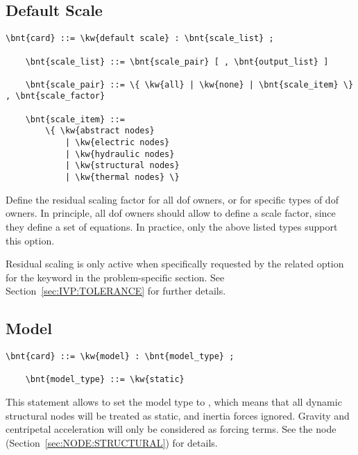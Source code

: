 \subsection{Default Scale}\label{sec:CONTROLDATA:DEFAULTSCALE}
\begin{Verbatim}[commandchars=\\\{\}]
    \bnt{card} ::= \kw{default scale} : \bnt{scale_list} ;

    \bnt{scale_list} ::= \bnt{scale_pair} [ , \bnt{output_list} ]

    \bnt{scale_pair} ::= \{ \kw{all} | \kw{none} | \bnt{scale_item} \} , \bnt{scale_factor}

    \bnt{scale_item} ::=
        \{ \kw{abstract nodes}
            | \kw{electric nodes}
            | \kw{hydraulic nodes}
            | \kw{structural nodes}
            | \kw{thermal nodes} \}
\end{Verbatim}
Define the residual scaling factor for all dof owners, or for specific
types of dof owners.
In principle, all dof owners should allow to define a scale factor,
since they define a set of equations.
In practice, only the above listed types support this option.

Residual scaling is only active when specifically requested
by the related option for the  keyword
in the problem-specific section.
See Section~\ref{sec:IVP:TOLERANCE} for further details.


\subsection{Model}
\label{sec:CONTROLDATA:MODEL}
\begin{Verbatim}[commandchars=\\\{\}]
    \bnt{card} ::= \kw{model} : \bnt{model_type} ;

    \bnt{model_type} ::= \kw{static}
\end{Verbatim}
This statement allows to set the model type to , which means
that all dynamic structural nodes will be treated as static, and inertia
forces ignored.
Gravity and centripetal acceleration will only be considered as forcing
terms.
See the  node (Section~\ref{sec:NODE:STRUCTURAL}) for details.



